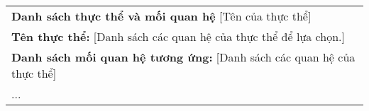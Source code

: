 \begin{table}[ht]
{\begin{tabular}{p{}}
            \textbf{Danh sách thực thể và mối quan hệ} [Tên của thực thể]                                                                                                                                          \\
            \hspace{1cm}\textbf{Tên thực thể:} [Danh sách các quan hệ của thực thể để lựa chọn.]                                                                                                                   \\
            \hspace{1cm}\textbf{Danh sách mối quan hệ tương ứng:} [Danh sách các quan hệ của thực thể]                                                                                                             \\
            \hspace{1cm}...                                                                                                                                                                                        \\
            \bottomrule
        \end{tabular}}
\end{table}


